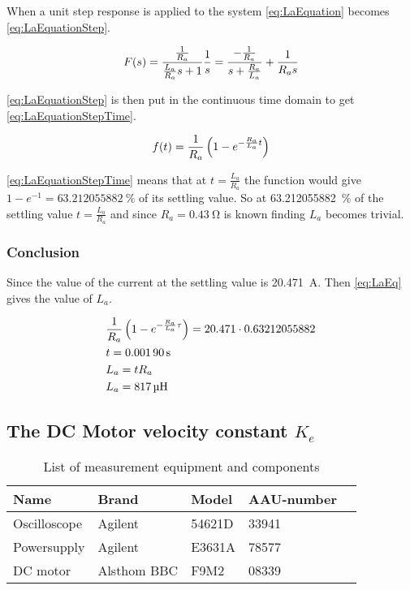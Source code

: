 When a unit step response is applied to the system \autoref{eq:LaEquation} becomes \autoref{eq:LaEquationStep}.

\begin{equation}
F(s)=\frac{\frac{1}{R_a}}{\frac{L_a}{R_a} s+1}\frac{1}{s}=\frac{-\frac{1}{R_a}}{s+\frac{R_a}{L_a}}+\frac{1}{R_a s} \addunit{1}
\label{eq:LaEquationStep}
\end{equation}

\autoref{eq:LaEquationStep} is then put in the continuous time domain to get \autoref{eq:LaEquationStepTime}.

\begin{equation}
f(t)= \frac{1}{R_a} \left(1-e^{-\frac{R_a}{L_a} t}\right) \addunit{1}
\label{eq:LaEquationStepTime}
\end{equation}

\autoref{eq:LaEquationStepTime} means that at $t=\frac{L_a}{R_a}$ the function would give $1-e^{-1}=\SI{63.212055882}{\percent}$ of its settling value. So at \SI{63.212055882}{\percent} of the settling value $t=\frac{L_a}{R_a}$ and since $R_a=\SI{0.43}{\ohm}$ \cite{datasheet:saradc} is known finding $L_a$ becomes trivial.

\subsubsection*{Conclusion}

Since the value of the current at the settling value is \SI{20.471}{\ampere}. Then \autoref{eq:LaEq} gives the value of $L_a$.

\begin{subequations} \label{eq:LaEq}
	\begin{flalign}
		&\frac{1}{R_a} \left(1-e^{-\frac{R_a}{L_a} \tau}\right)=20.471 \cdot 0.63212055882 \addunit{\second} \\
		&t = \SI{0.00190}{\second} \\
		&L_a=tR_a \\
		&L_a=\SI{817}{\micro\henry}
	\end{flalign}
\end{subequations}


\subsection{The DC Motor velocity constant $K_e$}

\begin{table}[htbp]
	\centering
	\caption{List of measurement equipment and components}\label{tab_appendix:KeSetUp}
	
	\begin{tabularx}{\textwidth}{lXXXX}
		Name 				& Brand	& Model & AAU-number									\\ \toprule \rowcolor{lightGrey}
		Oscilloscope	& Agilent & 54621D & 33941 	\\
		Powersupply	& Agilent & E3631A & 78577\\ \rowcolor{lightGrey}
		DC motor & Alsthom BBC & F9M2& 08339
	\end{tabularx}
\end{table}


